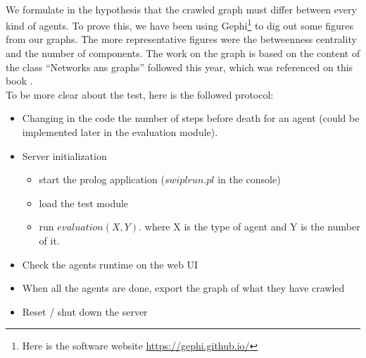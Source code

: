 \documentclass{article}
\newenvironment{itemh}[0]{\begin{itemize}[font=\color{mygray} \small]}{\end{itemize}}
\newenvironment{itemH}[0]{\begin{itemize}[font=\color{mygray} \large]}{\end{itemize}}
\begin{document}
		\paragraph{}
			We formulate in the hypothesis that the crawled graph must differ between every kind of agents.
			To prove this, we have been using Gephi\footnote{
				Here is the software website \url{https://gephi.github.io/}
			} to dig out some figures from our graphs.
			The more representative figures were the betweenness centrality and the number of components.
			The work on the graph is based on the content of the class ``Networks ans graphs'' followed this year,
			which was referenced on this book \cite{Steen10}.\\
		\newline
			To be more clear about the test, here is the followed protocol:
			\begin{itemH}
				\item Changing in the code the number of steps before death for an agent
				(could be implemented later in the evaluation module).
				\item Server initialization
				\begin{itemh}
					\item start the prolog application ($swipl run.pl$ in the console)
					\item load the test module
					\item run $evaluation(X,Y).$ where X is the type of agent and Y is the number of it.
				\end{itemh}
				\item Check the agents runtime on the web UI
				\item When all the agents are done, export the graph of what they have crawled
				\item Reset / shut down the server
			\end{itemH}
\end{document}
